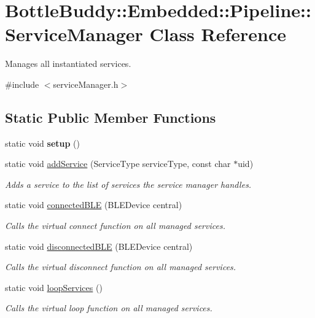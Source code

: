 \hypertarget{class_bottle_buddy_1_1_embedded_1_1_pipeline_1_1_service_manager}{}\section{Bottle\+Buddy\+:\+:Embedded\+:\+:Pipeline\+:\+:Service\+Manager Class Reference}
\label{class_bottle_buddy_1_1_embedded_1_1_pipeline_1_1_service_manager}


Manages all instantiated services.  




{\ttfamily \#include $<$service\+Manager.\+h$>$}

\subsection*{Static Public Member Functions}
\begin{DoxyCompactItemize}
\item 
static void {\bfseries setup} ()\hypertarget{class_bottle_buddy_1_1_embedded_1_1_pipeline_1_1_service_manager_a3645b32be1b97361141982150c8dc318}{}\label{class_bottle_buddy_1_1_embedded_1_1_pipeline_1_1_service_manager_a3645b32be1b97361141982150c8dc318}

\item 
static void \hyperlink{class_bottle_buddy_1_1_embedded_1_1_pipeline_1_1_service_manager_ade2a555e0af07001d80107db31ec2333}{add\+Service} (Service\+Type service\+Type, const char $\ast$uid)
\begin{DoxyCompactList}\small\item\em Adds a service to the list of services the service manager handles. \end{DoxyCompactList}\item 
static void \hyperlink{class_bottle_buddy_1_1_embedded_1_1_pipeline_1_1_service_manager_a6218a21b71a8d30218474bef751bb07e}{connected\+B\+LE} (B\+L\+E\+Device central)
\begin{DoxyCompactList}\small\item\em Calls the virtual connect function on all managed services. \end{DoxyCompactList}\item 
static void \hyperlink{class_bottle_buddy_1_1_embedded_1_1_pipeline_1_1_service_manager_afa245de1607ce16228ecd14aad2edc72}{disconnected\+B\+LE} (B\+L\+E\+Device central)
\begin{DoxyCompactList}\small\item\em Calls the virtual disconnect function on all managed services. \end{DoxyCompactList}\item 
static void \hyperlink{class_bottle_buddy_1_1_embedded_1_1_pipeline_1_1_service_manager_a3c701a58eaba061104576c0cfc25f3fb}{loop\+Services} ()
\begin{DoxyCompactList}\small\item\em Calls the virtual loop function on all managed services. \end{DoxyCompactList}\end{DoxyCompactItemize}


